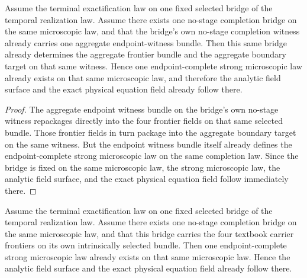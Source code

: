 \begin{theorem}
\label{thm:law-native-flagship-witness-bridge-recovers-the-strong-microscopic-package}
Assume the terminal exactification law on one fixed selected bridge of the
temporal realization law. Assume there exists one no-stage completion bridge on
the same microscopic law, and that the bridge's own no-stage completion
witness already carries one aggregate endpoint-witness bundle. Then this same
bridge already determines the aggregate frontier bundle and the aggregate
boundary target on that same witness. Hence one endpoint-complete strong
microscopic law already exists on that same microscopic law, and therefore the
analytic field surface and the exact physical equation field already follow
there.
\end{theorem}

\begin{proof}
The aggregate endpoint witness bundle on the bridge's own no-stage witness
repackages directly into the four frontier fields on that same selected
bundle. Those frontier fields in turn package into the aggregate boundary
target on the same witness. But the endpoint witness bundle itself already
defines the endpoint-complete strong microscopic law on the same completion
law. Since the bridge is fixed on the same microscopic law, the strong
microscopic law, the analytic field surface, and the exact physical equation
field follow immediately there.
\end{proof}

\begin{theorem}
\label{thm:law-native-flagship-frontier-bridge-recovers-the-strong-microscopic-package}
Assume the terminal exactification law on one fixed selected bridge of the
temporal realization law. Assume there exists one no-stage completion bridge on
the same microscopic law, and that this bridge carries the four textbook
carrier frontiers on its own intrinsically selected bundle. Then one
endpoint-complete strong microscopic law already exists on that same
microscopic law. Hence the analytic field surface and the exact physical
equation field already follow there.
\end{theorem}

